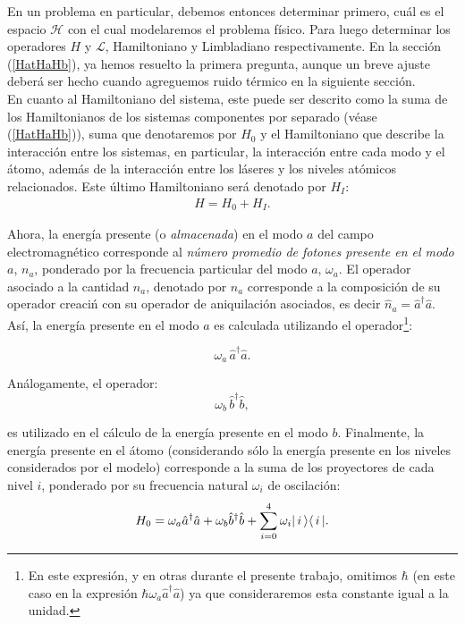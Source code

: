 \quad En un problema en particular, debemos entonces determinar primero, cu\'al es el espacio $\mathcal{H}$ con el cual modelaremos el problema f\'isico. Para luego determinar los operadores $H$ y $\mathcal{L}$, Hamiltoniano y Limbladiano respectivamente. En la secci\'on (\ref{HatHaHb}), ya hemos resuelto la primera pregunta, aunque un breve ajuste deber\'a ser hecho cuando agreguemos ruido t\'ermico en la siguiente secci\'on.\\

\quad En cuanto al Hamiltoniano del sistema, este puede ser descrito como la suma de los Hamiltonianos de los sistemas componentes por separado (v\'ease (\ref{HatHaHb})), suma que denotaremos por $H_0$ y el Hamiltoniano que describe la interacci\'on entre los sistemas, en particular, la interacci\'on entre cada modo y el \'atomo, adem\'as de la interacci\'on entre los l\'aseres y los niveles at\'omicos relacionados. Este \'ultimo Hamiltoniano ser\'a denotado por $H_I$:
\begin{eqnarray}
 H=H_0+H_I.
\end{eqnarray}

\quad Ahora, la energ\'ia presente (o \emph{almacenada}) en el modo $a$ del campo electromagn\'etico corresponde al \emph{n\'umero promedio de fotones presente en el modo $a$}, $n_a$, ponderado por la frecuencia particular del modo $a$, $\omega_a$. El operador asociado a la cantidad $n_a$, denotado por $\hat{n}_a$ corresponde a la composici\'on de su operador creaci\'n con su operador de aniquilaci\'on asociados, es decir $\hat{n}_a=\hat{a}^\dag \hat{a}$. As\'i, la energ\'ia presente en el modo $a$ es calculada utilizando el operador\footnote{En este expresi\'on, y en otras durante el presente trabajo, omitimos $\hbar$ (en este caso en la expresi\'on $\hbar\omega_a\hat{a}^\dag \hat{a}$) ya que consideraremos esta constante igual a la unidad.}:

$$\omega_a\,\hat{a}^\dag \hat{a}.$$

\quad An\'alogamente, el operador: $$\omega_b\,\hat{b}^\dag \hat{b},$$

es utilizado en el c\'alculo de la energ\'ia presente en el modo $b$. Finalmente, la energ\'ia presente en el \'atomo (considerando s\'olo la energ\'ia presente en los niveles considerados por el modelo) corresponde a la suma de los proyectores de cada nivel $i$, ponderado por su frecuencia natural $\omega_i$ de oscilaci\'on:
\begin{equation}
 H_0=\omega_a \hat{a}^\dag \hat{a} + \omega_b \hat{b}^\dag \hat{b}+\sum_{i=0}^4 \omega_i \vert\, i \,\rangle\langle\, i \,\vert.\label{ec:H0}
\end{equation}

